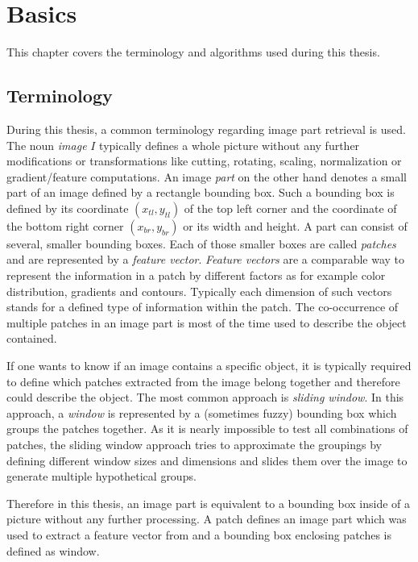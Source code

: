 \chapter{Basics}

This chapter covers the terminology and algorithms used during this thesis. 

\section{Terminology}
\label{sec:basic:terminology}

During this thesis, a common terminology regarding image part retrieval is used. The noun \textit{image} $I$ typically defines a whole picture without any further modifications or transformations like cutting, rotating, scaling, normalization or gradient/feature computations. An image \textit{part} on the other hand denotes a small part of an image defined by a rectangle bounding box. Such a bounding box is defined by its coordinate $(x_{tl},y_{tl})$ of the top left corner and the coordinate of the bottom right corner $(x_{br},y_{br})$ or its width and height. A part can consist of several, smaller bounding boxes. Each of those smaller boxes are called \textit{patches} and are represented by a \textit{feature vector}. \textit{Feature vectors} are a comparable way to represent the information in a patch by different factors as for example color distribution, gradients and contours. Typically each dimension of such vectors stands for a defined type of information within the patch. The co-occurrence of multiple patches in an image part is most of the time used to describe the object contained.

If one wants to know if an image contains a specific object, it is typically required to define which patches extracted from the image belong together and therefore could describe the object. The most common approach is \textit{sliding window}. In this approach, a \textit{window} is represented by a (sometimes fuzzy) bounding box which groups the patches together. As it is nearly impossible to test all combinations of patches, the sliding window approach tries to approximate the groupings by defining different window sizes and dimensions and slides them over the image to generate multiple hypothetical groups.

Therefore in this thesis, an image part is equivalent to a bounding box inside of a picture without any further processing. A patch defines an image part which was used to extract a feature vector from and a bounding box enclosing patches is defined as window.
\bigskip


